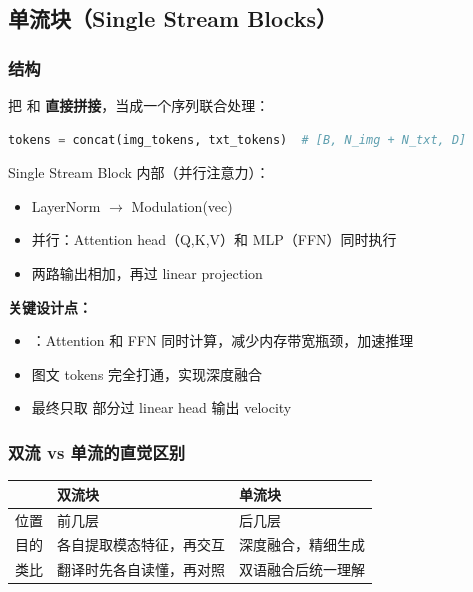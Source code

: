 \subsection{单流块（Single Stream Blocks）}

\subsubsection{结构}

把  和  \textbf{直接拼接}，当成一个序列联合处理：

\begin{lstlisting}[language=Python]
tokens = concat(img_tokens, txt_tokens)  # [B, N_img + N_txt, D]
\end{lstlisting}

Single Stream Block 内部（并行注意力）：
\begin{itemize}[leftmargin=1.5em]
  \item LayerNorm $\to$ Modulation(vec)
  \item 并行：Attention head（Q,K,V）和 MLP（FFN）同时执行
  \item 两路输出相加，再过 linear projection
\end{itemize}

\begin{conceptbox}
\textbf{关键设计点：}
\begin{itemize}[leftmargin=1.5em]
  \item {}：Attention 和 FFN 同时计算，减少内存带宽瓶颈，加速推理
  \item 图文 tokens 完全打通，实现深度融合
  \item 最终只取  部分过 linear head 输出 velocity
\end{itemize}
\end{conceptbox}

\subsubsection{双流 vs 单流的直觉区别}

\begin{summarybox}
\begin{center}
{\small
\begin{tabular}{p{2.5cm}p{5cm}p{5cm}}
\hline
 & \textbf{双流块} & \textbf{单流块} \\
\hline
位置 & 前几层 & 后几层 \\
目的 & 各自提取模态特征，再交互 & 深度融合，精细生成 \\
类比 & 翻译时先各自读懂，再对照 & 双语融合后统一理解 \\
\hline
\end{tabular}
}
\end{center}
\end{summarybox}

